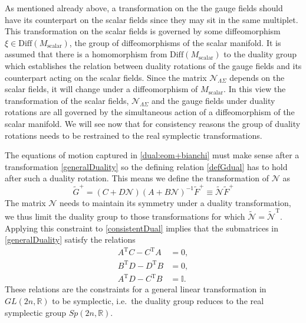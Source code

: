\documentclass[12pt,twoside]{book}
\begin{document}
As mentioned already above, a transformation on the the gauge fields should have its counterpart on the scalar fields since they may sit in the same multiplet. This transformation on the scalar fields is governed by some diffeomorphism $\xi \in \text{Diff}(M_{\mathrm{scalar}})$, the group of diffeomorphisms of the scalar manifold. It is assumed that there is a homomorphism from $\text{Diff}(M_{\mathrm{scalar}})$ to the duality group which establishes the relation between duality rotations of the gauge fields and its counterpart acting on the scalar fields. Since the matrix $\mathcal{N}_{\Lambda\Sigma}$ depends on the scalar fields, it will change under a diffeomorphism of $M_{\mathrm{scalar}}$. In this view the transformation of the scalar fields, $\mathcal{N}_{\Lambda\Sigma}$ and the gauge fields under duality rotations are all governed by the simultaneous action of a diffeomorphism of the scalar manifold. We will see now that for consistency reasons the group of duality rotations needs to be restrained to the real symplectic transformations.

The equations of motion captured in \eqref{dual:eom+bianchi} must make sense after a transformation \eqref{generalDuality} so the defining relation \eqref{defGdual} has to hold after such a duality rotation. This means we define the transformation of $\mathcal{N}$ as
\begin{equation}\label{consistentDual}
\tilde{G}^{+}=(C+D\mathcal{N})(A+B\mathcal{N})^{-1}\tilde{F}^{+}\equiv\tilde{\mathcal{N}}\tilde{F}^{+}
\end{equation}
The matrix $\mathcal{N}$ needs to maintain its symmetry under a duality transformation, we thus limit the duality group to those transformations for which $\tilde{\mathcal{N}}=\tilde{\mathcal{N}}^{\mathrm{T}}$. Applying this constraint to \eqref{consistentDual} implies that the submatrices in \eqref{generalDuality} satisfy the relations
\begin{equation}
\begin{split}
A^{\mathrm{T}} C - C^{\mathrm{T}}A &= 0, \\
B^{\mathrm{T}} D - D^{\mathrm{T}}B &= 0, \\
A^{\mathrm{T}} D - C^{\mathrm{T}}B &= \mathbb{I}.
\end{split}
\end{equation}
These relations are the constraints for a general linear transformation in $GL(2n,\mathbb{R})$ to be symplectic, i.e.\ the duality group reduces to the real symplectic group $Sp(2n,\mathbb{R})$.\newline
\end{document}

